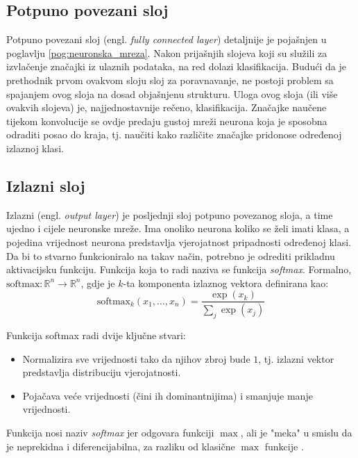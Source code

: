 \subsection{Potpuno povezani sloj}
\label{sub:dense}
Potpuno povezani sloj (engl. \textit{fully connected layer}) detaljnije je pojašnjen u poglavlju
\ref{pog:neuronska_mreza}. Nakon prijašnjih slojeva koji su služili za izvlačenje
značajki iz ulaznih podataka, na red dolazi klasifikacija. Budući da je prethodnik
prvom ovakvom sloju sloj za poravnavanje, ne postoji problem sa spajanjem ovog sloja na dosad
objašnjenu strukturu. Uloga ovog sloja (ili više ovakvih slojeva) je, najjednostavnije
rečeno, klasifikacija. Značajke naučene tijekom konvolucije se ovdje predaju gustoj mreži
neurona koja je sposobna odraditi posao do kraja, tj. naučiti kako različite značajke
pridonose određenoj izlaznoj klasi.

\subsection{Izlazni sloj}
\label{sub:output}
Izlazni (engl. \textit{output layer}) je posljednji sloj potpuno povezanog sloja, a time ujedno i cijele
neuronske mreže. Ima onoliko neurona koliko se želi imati klasa, a pojedina vrijednost
neurona predstavlja vjerojatnost pripadnosti određenoj klasi. Da bi to stvarno funkcioniralo na takav
način, potrebno je odrediti prikladnu aktivacijsku funkciju. Funkcija koja to radi 
naziva se funkcija \textit{softmax}. 
Formalno, \( \text{softmax} : \mathbb{R}^n \to \mathbb{R}^n \),
gdje je \( k \)-ta komponenta izlaznog vektora definirana kao:
\begin{equation}
\text{softmax}_k(x_1, \dots, x_n) = \frac{\exp(x_k)}{\sum_{j} \exp(x_j)}
\end{equation}

Funkcija softmax radi dvije ključne stvari:
\begin{itemize}
    \item Normalizira sve vrijednosti tako da njihov zbroj bude \( 1 \), tj. izlazni vektor 
        predstavlja distribuciju vjerojatnosti.
    \item Pojačava veće vrijednosti (čini ih dominantnijima) i smanjuje manje vrijednosti.
\end{itemize}

Funkcija nosi naziv \textit{softmax} jer odgovara funkciji \( \max \), ali je "meka" u smislu
da je neprekidna i diferencijabilna, za razliku od klasične \( \max \) funkcije 
\cite{snajder2023logreg}.

